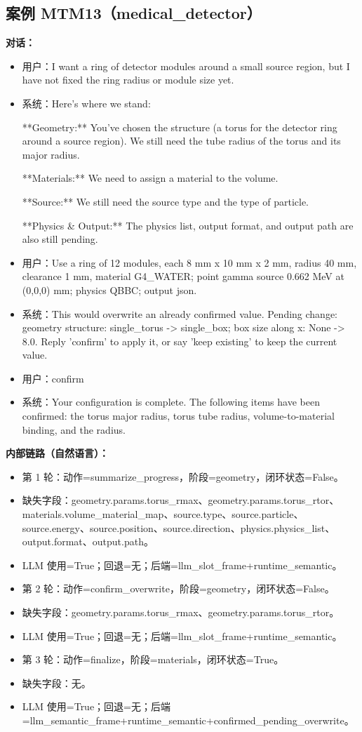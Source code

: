 \documentclass[11pt]{ctexart}
\begin{document}
\subsection{案例 MTM13（medical\_detector）}
\textbf{对话：}
\begin{itemize}
\item 用户：I want a ring of detector modules around a small source region, but I have not fixed the ring radius or module size yet.
\item 系统：Here's where we stand:

**Geometry:** You've chosen the structure (a torus for the detector ring around a source region). We still need the tube radius of the torus and its major radius.

**Materials:** We need to assign a material to the volume.

**Source:** We still need the source type and the type of particle.

**Physics \& Output:** The physics list, output format, and output path are also still pending.
\item 用户：Use a ring of 12 modules, each 8 mm x 10 mm x 2 mm, radius 40 mm, clearance 1 mm, material G4\_WATER; point gamma source 0.662 MeV at (0,0,0) mm; physics QBBC; output json.
\item 系统：This would overwrite an already confirmed value. Pending change: geometry structure: single\_torus -> single\_box; box size along x: None -> 8.0. Reply 'confirm' to apply it, or say 'keep existing' to keep the current value.
\item 用户：confirm
\item 系统：Your configuration is complete. The following items have been confirmed: the torus major radius, torus tube radius, volume-to-material binding, and the radius.
\end{itemize}
\textbf{内部链路（自然语言）：}
\begin{itemize}
\item 第 1 轮：动作=summarize\_progress，阶段=geometry，闭环状态=False。
\item 缺失字段：geometry.params.torus\_rmax、geometry.params.torus\_rtor、materials.volume\_material\_map、source.type、source.particle、source.energy、source.position、source.direction、physics.physics\_list、output.format、output.path。
\item LLM 使用=True；回退=无；后端=llm\_slot\_frame+runtime\_semantic。
\item 第 2 轮：动作=confirm\_overwrite，阶段=geometry，闭环状态=False。
\item 缺失字段：geometry.params.torus\_rmax、geometry.params.torus\_rtor。
\item LLM 使用=True；回退=无；后端=llm\_slot\_frame+runtime\_semantic。
\item 第 3 轮：动作=finalize，阶段=materials，闭环状态=True。
\item 缺失字段：无。
\item LLM 使用=True；回退=无；后端=llm\_semantic\_frame+runtime\_semantic+confirmed\_pending\_overwrite。
\end{itemize}
\end{document}
